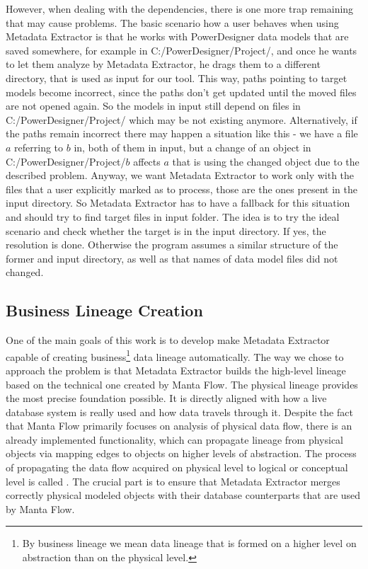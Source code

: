 However, when dealing with the dependencies, there is one more trap remaining that may cause problems. The basic scenario how a user behaves when using Metadata Extractor is that he works with PowerDesigner data models that are saved somewhere, for example in C:/PowerDesigner/Project/, and once he wants to let them analyze by Metadata Extractor, he drags them to a different directory, that is used as input for our tool.
This way, paths pointing to target models become incorrect, since the paths don't get updated until the moved files are not opened again. 
So the models in input still depend on files in C:/PowerDesigner/Project/ which may be not existing anymore. Alternatively, if the paths remain incorrect there may happen a situation like this - we have a file $a$ referring to $b$ in, both of them in input, but a change of an object in C:/PowerDesigner/Project/$b$ affects $a$ that is using the changed object due to the described problem.
Anyway, we want Metadata Extractor to work only with the files that a user explicitly marked as to process, those are the ones present in the input directory.
So Metadata Extractor has to have a fallback for this situation and should try to find target files in input folder.
The idea is to try the ideal scenario and check whether the target is in the input directory. If yes, the resolution is done.
Otherwise the program assumes a similar structure of the former and input directory, as well as that names of data model files did not changed.

\subsection{Business Lineage Creation}

One of the main goals of this work is to develop make Metadata Extractor capable of creating business\footnote{By business lineage we mean data lineage that is formed on a higher level on abstraction than on the physical level.} data lineage automatically.
The way we chose to approach the problem is that Metadata Extractor builds the high-level lineage based on the technical one created by Manta Flow. 
The physical lineage provides the most precise foundation possible. 
It is directly aligned with how a live database system is really used and how data travels through it.
Despite the fact that Manta Flow primarily focuses on analysis of physical data flow, there is an already implemented functionality, which can propagate lineage from physical objects via mapping edges to objects on higher levels of abstraction.
The process of propagating the data flow acquired on physical level to logical or conceptual level is called .
The crucial part is to ensure that Metadata Extractor merges correctly physical modeled objects with their database counterparts that are used by Manta Flow.

